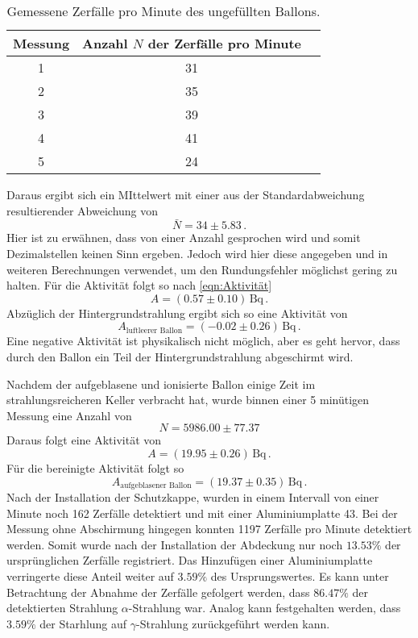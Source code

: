 \begin{table}
    \centering 
    \caption{Gemessene Zerfälle pro Minute des ungefüllten Ballons.}
    \begin{tabular}{c c c}
        \toprule
        Messung & Anzahl $N$ der Zerfälle pro Minute\\
        \midrule
        1 & 31 \\
        2 & 35 \\
        3 & 39 \\
        4 & 41 \\
        5 & 24 \\
    \end{tabular}
\end{table}
Daraus ergibt sich ein MIttelwert mit einer aus der Standardabweichung resultierender Abweichung von
\begin{equation*}
    \bar{N}= 34\pm 5.83\, .
\end{equation*}
Hier ist zu erwähnen, dass von einer Anzahl gesprochen wird und somit Dezimalstellen keinen Sinn ergeben. Jedoch wird hier diese angegeben und in weiteren 
Berechnungen verwendet, um den Rundungsfehler möglichst gering zu halten.
Für die Aktivität folgt so nach \autoref{eqn:Aktivität}
\begin{equation*}
    A= (0.57\pm 0.10)\, \text{Bq}\, .
\end{equation*}
Abzüglich der Hintergrundstrahlung ergibt sich so eine Aktivität von
\begin{equation*}
    A_{\text{luftleerer Ballon}}= (-0.02\pm 0.26)\, \text{Bq}\, .
\end{equation*}
Eine negative Aktivität ist physikalisch nicht möglich, aber es geht hervor, dass durch den Ballon ein Teil der Hintergrundstrahlung abgeschirmt wird.

Nachdem der aufgeblasene und ionisierte Ballon einige Zeit im strahlungsreicheren Keller verbracht hat, wurde binnen einer 5 minütigen Messung eine Anzahl
von 
\begin{equation*}
    N= 5986.00 \pm 77.37
\end{equation*} 
Daraus folgt eine Aktivität von
\begin{equation*}
    A= (19.95 \pm 0.26) \, \text{Bq}\, .
\end{equation*}
Für die bereinigte Aktivität folgt so 
\begin{equation*}
    A_{\text{aufgeblasener Ballon}}= (19.37\pm 0.35) \, \text{Bq}\, .
\end{equation*}
Nach der Installation der Schutzkappe, wurden in einem Intervall von einer Minute noch 162 Zerfälle detektiert und mit einer Aluminiumplatte 43.
Bei der Messung ohne Abschirmung hingegen konnten 1197 Zerfälle pro Minute detektiert werden.
Somit wurde nach der Installation der Abdeckung nur noch $13.53\%$ der ursprünglichen Zerfälle registriert.
Das Hinzufügen einer Aluminiumplatte verringerte diese Anteil weiter  auf $3.59\%$ des Ursprungswertes.
Es kann unter Betrachtung der Abnahme der Zerfälle gefolgert werden, dass $86.47\%$ der detektierten Strahlung $\alpha$-Strahlung war.
Analog kann festgehalten werden, dass $3.59\%$ der Starhlung auf $\gamma$-Strahlung zurückgeführt werden kann.